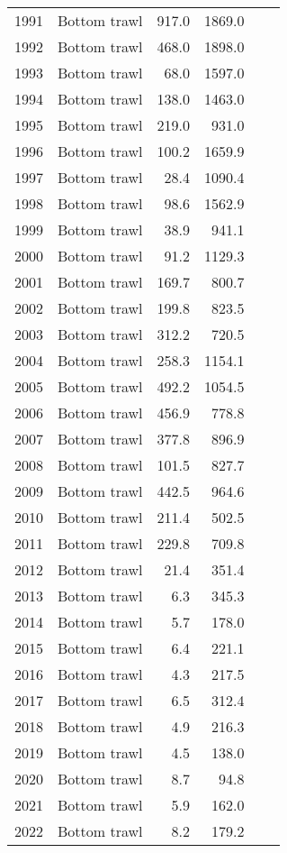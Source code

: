 \begin{longtable}[t]{llrrrr}
1991 & Bottom trawl & 917.0 & 1869.0 &  & \\
1992 & Bottom trawl & 468.0 & 1898.0 &  & \\
1993 & Bottom trawl & 68.0 & 1597.0 &  & \\
1994 & Bottom trawl & 138.0 & 1463.0 &  & \\
1995 & Bottom trawl & 219.0 & 931.0 &  & \\
1996 & Bottom trawl & 100.2 & 1659.9 &  & \\
1997 & Bottom trawl & 28.4 & 1090.4 &  & \\
1998 & Bottom trawl & 98.6 & 1562.9 &  & \\
1999 & Bottom trawl & 38.9 & 941.1 &  & \\
2000 & Bottom trawl & 91.2 & 1129.3 &  & \\
2001 & Bottom trawl & 169.7 & 800.7 &  & \\
2002 & Bottom trawl & 199.8 & 823.5 &  & \\
2003 & Bottom trawl & 312.2 & 720.5 &  & \\
2004 & Bottom trawl & 258.3 & 1154.1 &  & \\
2005 & Bottom trawl & 492.2 & 1054.5 &  & \\
2006 & Bottom trawl & 456.9 & 778.8 &  & \\
2007 & Bottom trawl & 377.8 & 896.9 &  & \\
2008 & Bottom trawl & 101.5 & 827.7 &  & \\
2009 & Bottom trawl & 442.5 & 964.6 &  & \\
2010 & Bottom trawl & 211.4 & 502.5 &  & \\
2011 & Bottom trawl & 229.8 & 709.8 &  & \\
2012 & Bottom trawl & 21.4 & 351.4 &  & \\
2013 & Bottom trawl & 6.3 & 345.3 &  & \\
2014 & Bottom trawl & 5.7 & 178.0 &  & \\
2015 & Bottom trawl & 6.4 & 221.1 &  & \\
2016 & Bottom trawl & 4.3 & 217.5 &  & \\
2017 & Bottom trawl & 6.5 & 312.4 &  & \\
2018 & Bottom trawl & 4.9 & 216.3 &  & \\
2019 & Bottom trawl & 4.5 & 138.0 &  & \\
2020 & Bottom trawl & 8.7 & 94.8 &  & \\
2021 & Bottom trawl & 5.9 & 162.0 &  & \\
2022 & Bottom trawl & 8.2 & 179.2 &  & \\

\end{longtable}
